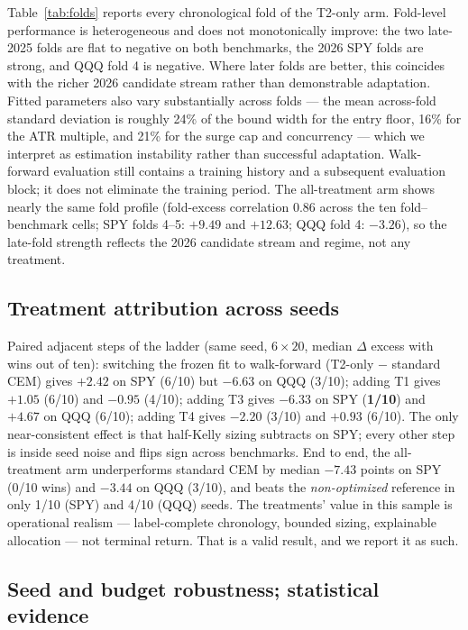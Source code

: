 \documentclass[sigconf,anonymous]{acmart}
\begin{document}
Table~\ref{tab:folds} reports every chronological fold of the T2-only arm. Fold-level performance is heterogeneous and does not monotonically improve: the two late-2025 folds are flat to negative on both benchmarks, the 2026 SPY folds are strong, and QQQ fold 4 is negative. Where later folds are better, this coincides with the richer 2026 candidate stream rather than demonstrable adaptation. Fitted parameters also vary substantially across folds --- the mean across-fold standard deviation is roughly 24\% of the bound width for the entry floor, 16\% for the ATR multiple, and 21\% for the surge cap and concurrency --- which we interpret as estimation instability rather than successful adaptation. Walk-forward evaluation still contains a training history and a subsequent evaluation block; it does not eliminate the training period. The all-treatment arm shows nearly the same fold profile (fold-excess correlation $0.86$ across the ten fold--benchmark cells; SPY folds 4--5: $+9.49$ and $+12.63$; QQQ fold 4: $-3.26$), so the late-fold strength reflects the 2026 candidate stream and regime, not any treatment.



\subsection{Treatment attribution across seeds}

Paired adjacent steps of the ladder (same seed, $6\times20$, median $\Delta$ excess with wins out of ten): switching the frozen fit to walk-forward (T2-only $-$ standard CEM) gives $+2.42$ on SPY (6/10) but $\mathbf{-6.63}$ on QQQ (3/10); adding T1 gives $+1.05$ (6/10) and $-0.95$ (4/10); adding T3 gives $\mathbf{-6.33}$ on SPY (\textbf{1/10}) and $+4.67$ on QQQ (6/10); adding T4 gives $-2.20$ (3/10) and $+0.93$ (6/10). The only near-consistent effect is that half-Kelly sizing subtracts on SPY; every other step is inside seed noise and flips sign across benchmarks. End to end, the all-treatment arm underperforms standard CEM by median $-7.43$ points on SPY (0/10 wins) and $-3.44$ on QQQ (3/10), and beats the \emph{non-optimized} reference in only 1/10 (SPY) and 4/10 (QQQ) seeds. The treatments' value in this sample is operational realism --- label-complete chronology, bounded sizing, explainable allocation --- not terminal return. That is a valid result, and we report it as such.

\subsection{Seed and budget robustness; statistical evidence}
\end{document}
